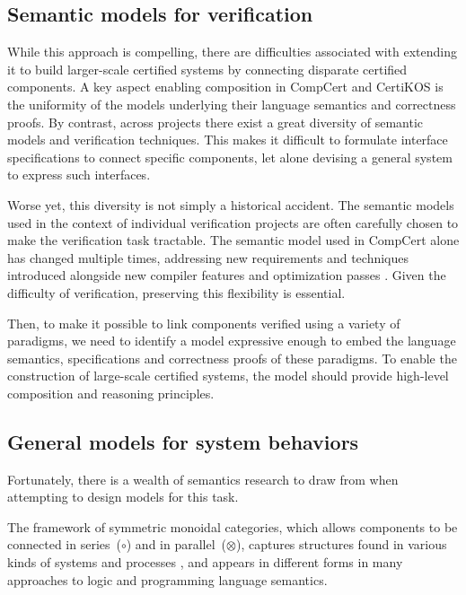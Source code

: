 \documentclass[sigplan,screen]{acmart}
\begin{document}

\subsection{Semantic models for verification} %

While this approach is compelling,
there are difficulties associated with extending it
to build larger-scale certified systems
by connecting disparate certified components.
A key aspect enabling composition in CompCert and CertiKOS
is the uniformity of the models underlying
their language semantics and correctness proofs.
By contrast,
across projects
there exist a great diversity
of semantic models and verification techniques.
This makes it difficult to formulate
interface specifications to connect specific components,
let alone devising a general system
to express such interfaces.

Worse yet,
this diversity is not simply a historical accident.
The semantic models
used in the context of individual verification projects
are often carefully chosen
to make the verification task tractable.
The semantic model used in CompCert alone
has changed multiple times,
addressing new requirements and techniques introduced alongside
new compiler features and optimization passes \cite{compsem}.
Given the difficulty of verification,
preserving this flexibility is essential.

Then,
to make it possible to link components
verified using a variety of paradigms,
we need to identify a model
expressive enough to embed
the language semantics, specifications and correctness proofs
of these paradigms.
To enable the construction of large-scale certified systems,
the model should provide
high-level composition and reasoning principles.


\subsection{General models for system behaviors} %

Fortunately,
there is a wealth of semantics research to draw from
when attempting to design models for this task.

The framework of
symmetric monoidal categories,
which allows components to be
connected in series~($\circ$) and in parallel~($\otimes$),
captures structures found
in various kinds of systems and processes \cite{rosetta},
and appears in different forms
in many approaches to logic and programming language semantics.
\end{document}
